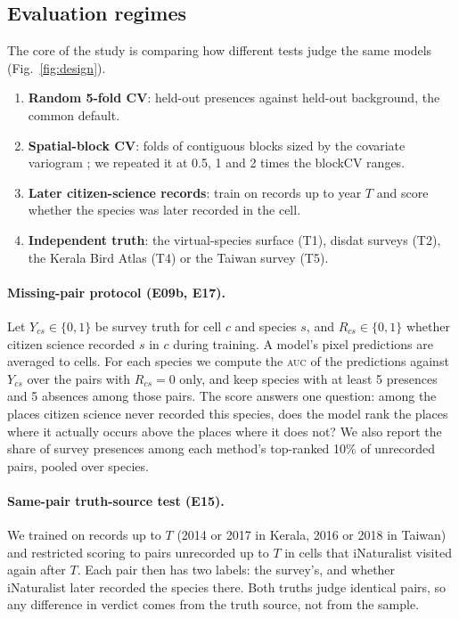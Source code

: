 \documentclass[11pt]{article}
\newcommand{\auc}{\textsc{auc}}
\begin{document}
\subsection{Evaluation regimes}
\label{sec:eval}
The core of the study is comparing how different tests judge the same models (Fig.~\ref{fig:design}).
\begin{enumerate}\setlength\itemsep{1pt}
\item \textbf{Random 5-fold CV}: held-out presences against held-out background, the common default.
\item \textbf{Spatial-block CV}: folds of contiguous blocks sized by the covariate variogram \citep{valavi2019,ploton2020}; we repeated it at 0.5, 1 and 2 times the blockCV ranges.
\item \textbf{Later citizen-science records}: train on records up to year $T$ and score whether the species was later recorded in the cell.
\item \textbf{Independent truth}: the virtual-species surface (T1), disdat surveys (T2), the Kerala Bird Atlas (T4) or the Taiwan survey (T5).
\end{enumerate}

\paragraph{Missing-pair protocol (E09b, E17).} Let $Y_{cs}\in\{0,1\}$ be survey truth for cell $c$ and species $s$, and $R_{cs}\in\{0,1\}$ whether citizen science recorded $s$ in $c$ during training. A model's pixel predictions are averaged to cells. For each species we compute the \auc{} of the predictions against $Y_{cs}$ over the pairs with $R_{cs}=0$ only, and keep species with at least 5 presences and 5 absences among those pairs. The score answers one question: among the places citizen science never recorded this species, does the model rank the places where it actually occurs above the places where it does not? We also report the share of survey presences among each method's top-ranked 10\% of unrecorded pairs, pooled over species.

\paragraph{Same-pair truth-source test (E15).} We trained on records up to $T$ (2014 or 2017 in Kerala, 2016 or 2018 in Taiwan) and restricted scoring to pairs unrecorded up to $T$ in cells that iNaturalist visited again after $T$. Each pair then has two labels: the survey's, and whether iNaturalist later recorded the species there. Both truths judge identical pairs, so any difference in verdict comes from the truth source, not from the sample.
\end{document}
